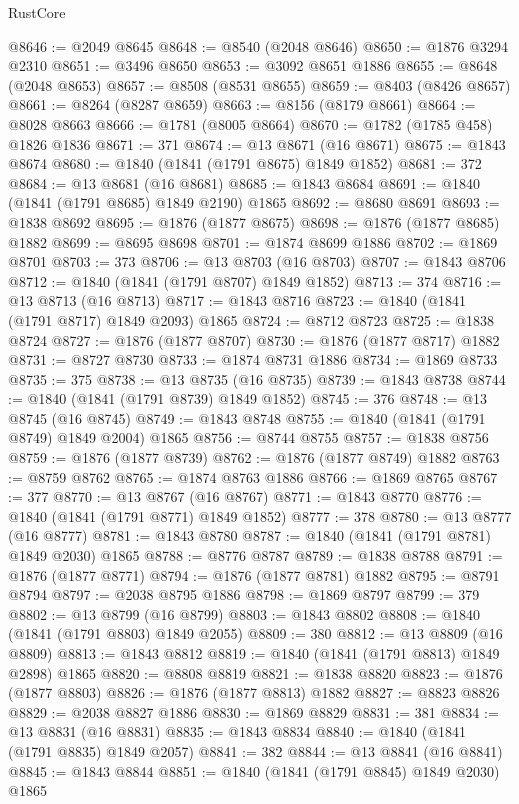 \begin{lexlean}{RustCore}
\begin{coremodule}
@8646 := @2049 @8645
@8648 := @8540 (@2048 @8646)
@8650 := @1876 @3294 @2310
@8651 := @3496 @8650
@8653 := @3092 @8651 @1886
@8655 := @8648 (@2048 @8653)
@8657 := @8508 (@8531 @8655)
@8659 := @8403 (@8426 @8657)
@8661 := @8264 (@8287 @8659)
@8663 := @8156 (@8179 @8661)
@8664 := @8028 @8663
@8666 := @1781 (@8005 @8664)
@8670 := @1782 (@1785 @458) @1826 @1836
@8671 := 371
@8674 := @13 @8671 (@16 @8671)
@8675 := @1843 @8674
@8680 := @1840 (@1841 (@1791 @8675) @1849 @1852)
@8681 := 372
@8684 := @13 @8681 (@16 @8681)
@8685 := @1843 @8684
@8691 := @1840 (@1841 (@1791 @8685) @1849 @2190) @1865
@8692 := @8680 @8691
@8693 := @1838 @8692
@8695 := @1876 (@1877 @8675)
@8698 := @1876 (@1877 @8685) @1882
@8699 := @8695 @8698
@8701 := @1874 @8699 @1886
@8702 := @1869 @8701
@8703 := 373
@8706 := @13 @8703 (@16 @8703)
@8707 := @1843 @8706
@8712 := @1840 (@1841 (@1791 @8707) @1849 @1852)
@8713 := 374
@8716 := @13 @8713 (@16 @8713)
@8717 := @1843 @8716
@8723 := @1840 (@1841 (@1791 @8717) @1849 @2093) @1865
@8724 := @8712 @8723
@8725 := @1838 @8724
@8727 := @1876 (@1877 @8707)
@8730 := @1876 (@1877 @8717) @1882
@8731 := @8727 @8730
@8733 := @1874 @8731 @1886
@8734 := @1869 @8733
@8735 := 375
@8738 := @13 @8735 (@16 @8735)
@8739 := @1843 @8738
@8744 := @1840 (@1841 (@1791 @8739) @1849 @1852)
@8745 := 376
@8748 := @13 @8745 (@16 @8745)
@8749 := @1843 @8748
@8755 := @1840 (@1841 (@1791 @8749) @1849 @2004) @1865
@8756 := @8744 @8755
@8757 := @1838 @8756
@8759 := @1876 (@1877 @8739)
@8762 := @1876 (@1877 @8749) @1882
@8763 := @8759 @8762
@8765 := @1874 @8763 @1886
@8766 := @1869 @8765
@8767 := 377
@8770 := @13 @8767 (@16 @8767)
@8771 := @1843 @8770
@8776 := @1840 (@1841 (@1791 @8771) @1849 @1852)
@8777 := 378
@8780 := @13 @8777 (@16 @8777)
@8781 := @1843 @8780
@8787 := @1840 (@1841 (@1791 @8781) @1849 @2030) @1865
@8788 := @8776 @8787
@8789 := @1838 @8788
@8791 := @1876 (@1877 @8771)
@8794 := @1876 (@1877 @8781) @1882
@8795 := @8791 @8794
@8797 := @2038 @8795 @1886
@8798 := @1869 @8797
@8799 := 379
@8802 := @13 @8799 (@16 @8799)
@8803 := @1843 @8802
@8808 := @1840 (@1841 (@1791 @8803) @1849 @2055)
@8809 := 380
@8812 := @13 @8809 (@16 @8809)
@8813 := @1843 @8812
@8819 := @1840 (@1841 (@1791 @8813) @1849 @2898) @1865
@8820 := @8808 @8819
@8821 := @1838 @8820
@8823 := @1876 (@1877 @8803)
@8826 := @1876 (@1877 @8813) @1882
@8827 := @8823 @8826
@8829 := @2038 @8827 @1886
@8830 := @1869 @8829
@8831 := 381
@8834 := @13 @8831 (@16 @8831)
@8835 := @1843 @8834
@8840 := @1840 (@1841 (@1791 @8835) @1849 @2057)
@8841 := 382
@8844 := @13 @8841 (@16 @8841)
@8845 := @1843 @8844
@8851 := @1840 (@1841 (@1791 @8845) @1849 @2030) @1865

\end{coremodule}
\end{lexlean}
